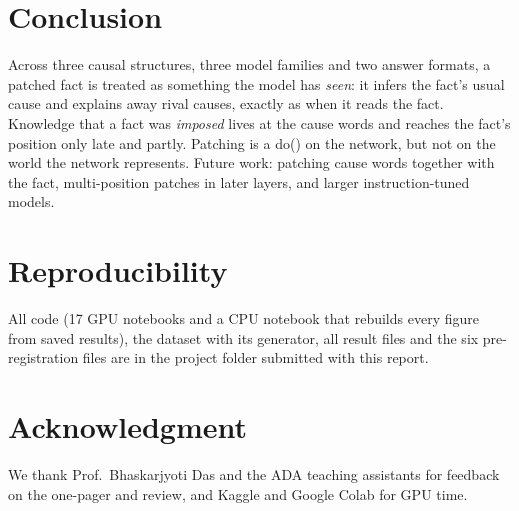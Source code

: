 \documentclass[conference]{IEEEtran}
\begin{document}
\section{Conclusion}
Across three causal structures, three model families and two answer formats, a patched fact is treated as something the model has \emph{seen}: it infers the fact's usual cause and explains away rival causes, exactly as when it reads the fact. Knowledge that a fact was \emph{imposed} lives at the cause words and reaches the fact's position only late and partly. Patching is a do() on the network, but not on the world the network represents. Future work: patching cause words together with the fact, multi-position patches in later layers, and larger instruction-tuned models.

\section*{Reproducibility}
All code (17 GPU notebooks and a CPU notebook that rebuilds every figure from saved results), the dataset with its generator, all result files and the six pre-registration files are in the project folder submitted with this report.

\section*{Acknowledgment}
We thank Prof.\ Bhaskarjyoti Das and the ADA teaching assistants for feedback on the one-pager and review, and Kaggle and Google Colab for GPU time.
\end{document}
